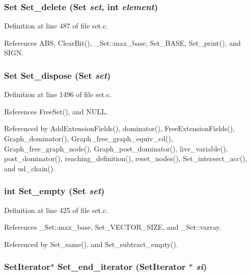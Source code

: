 \subsubsection{\setlength{\rightskip}{0pt plus 5cm}\bf{Set} Set\_\-delete (\bf{Set} {\em set}, int {\em element})}\label{set_8c_7b01b25cd140fd5447d96f8a81d8c83f}




Definition at line 487 of file set.c.

References ABS, Clear\-Bit(), \_\-Set::max\_\-base, Set\_\-BASE, Set\_\-print(), and SIGN.
\subsubsection{\setlength{\rightskip}{0pt plus 5cm}\bf{Set} Set\_\-dispose (\bf{Set} {\em set})}\label{set_8c_664c2639d7b63476b7c4bf6fa691c4c4}




Definition at line 1496 of file set.c.

References Free\-Set(), and NULL.

Referenced by Add\-Extension\-Fields(), dominator(), Free\-Extension\-Fields(), Graph\_\-dominator(), Graph\_\-free\_\-graph\_\-equiv\_\-cd(), Graph\_\-free\_\-graph\_\-node(), Graph\_\-post\_\-dominator(), live\_\-variable(), post\_\-dominator(), reaching\_\-definition(), reset\_\-nodes(), Set\_\-intersect\_\-acc(), and ud\_\-chain().
\subsubsection{\setlength{\rightskip}{0pt plus 5cm}int Set\_\-empty (\bf{Set} {\em set})}\label{set_8c_0b8d0a366fd0af723d55ad17f844c90d}




Definition at line 425 of file set.c.

References \_\-Set::max\_\-base, Set\_\-VECTOR\_\-SIZE, and \_\-Set::varray.

Referenced by Set\_\-same(), and Set\_\-subtract\_\-empty().
\subsubsection{\setlength{\rightskip}{0pt plus 5cm}\bf{Set\-Iterator}$\ast$ Set\_\-end\_\-iterator (\bf{Set\-Iterator} $\ast$ {\em si})}\label{set_8c_bf35c6edfe607eb753491656258013f4}




